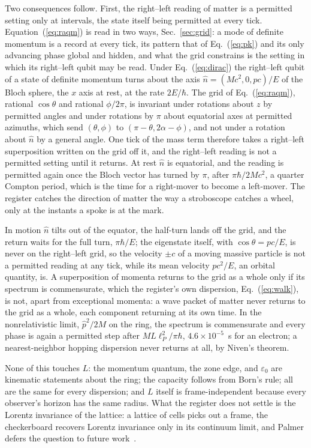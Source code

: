 \documentclass[aps,prd,twocolumn,superscriptaddress,nofootinbib]{revtex4-2}
\begin{document}
Two consequences follow. First, the right--left reading of matter is a permitted setting only at intervals, the state itself being permitted at every tick. Equation~(\ref{eq:raqm}) is read in two ways, Sec.~\ref{sec:grid}: a mode of definite momentum is a record at every tick, its pattern that of Eq.~(\ref{eq:pk}) and its only advancing phase global and hidden, and what the grid constrains is the setting in which its right--left qubit may be read. Under Eq.~(\ref{eq:dirac}) the right--left qubit of a state of definite momentum turns about the axis $\hat n = (Mc^2, 0, pc)/E$ of the Bloch sphere, the $x$ axis at rest, at the rate $2E/\hbar$. The grid of Eq.~(\ref{eq:raqm}), rational $\cos\theta$ and rational $\phi/2\pi$, is invariant under rotations about $z$ by permitted angles and under rotations by $\pi$ about equatorial axes at permitted azimuths, which send $(\theta,\phi)$ to $(\pi-\theta, 2\alpha-\phi)$, and not under a rotation about $\hat n$ by a general angle. One tick of the mass term therefore takes a right--left superposition written on the grid off it, and the right--left reading is not a permitted setting until it returns. At rest $\hat n$ is equatorial, and the reading is permitted again once the Bloch vector has turned by $\pi$, after $\pi\hbar/2Mc^2$, a quarter Compton period, which is the time for a right-mover to become a left-mover. The register catches the direction of matter the way a stroboscope catches a wheel, only at the instants a spoke is at the mark.

In motion $\hat n$ tilts out of the equator, the half-turn lands off the grid, and the return waits for the full turn, $\pi\hbar/E$; the eigenstate itself, with $\cos\theta = pc/E$, is never on the right--left grid, so the velocity $\pm c$ of a moving massive particle is not a permitted reading at any tick, while its mean velocity $pc^2/E$, an orbital quantity, is. A superposition of momenta returns to the grid as a whole only if its spectrum is commensurate, which the register's own dispersion, Eq.~(\ref{eq:walk}), is not, apart from exceptional momenta: a wave packet of matter never returns to the grid as a whole, each component returning at its own time. In the nonrelativistic limit, $\hat p^2/2M$ on the ring, the spectrum is commensurate and every phase is again a permitted step after $ML\ell_P^2/\pi\hbar$, $4.6\times10^{-5}$~s for an electron; a nearest-neighbor hopping dispersion never returns at all, by Niven's theorem.

None of this touches $L$: the momentum quantum, the zone edge, and $\varepsilon_0$ are kinematic statements about the ring; the capacity follows from Born's rule; all are the same for every dispersion; and $L$ itself is frame-independent because every observer's horizon has the same radius. What the register does not settle is the Lorentz invariance of the lattice: a lattice of cells picks out a frame, the checkerboard recovers Lorentz invariance only in its continuum limit, and Palmer defers the question to future work~\cite{palmer2026c}.
\end{document}
